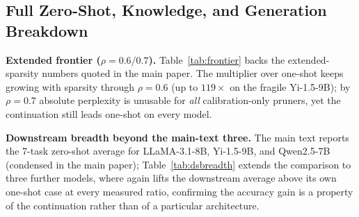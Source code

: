\subsection{Full Zero-Shot, Knowledge, and Generation Breakdown}
\label{app:breakdown}

\textbf{Extended frontier ($\rho{=}0.6/0.7$).} Table~\ref{tab:frontier} backs the extended-sparsity
numbers quoted in the main paper. The multiplier over one-shot keeps growing with sparsity through
$\rho{=}0.6$ (up to $119\times$ on the fragile Yi-1.5-9B); by $\rho{=}0.7$ absolute perplexity is unusable
for \emph{all} calibration-only pruners, yet the continuation still leads one-shot on every model.

\begin{table}[h]\centering\footnotesize
\setlength{\tabcolsep}{5pt}\renewcommand{\arraystretch}{1.06}
\caption{\textbf{Extended sparsity frontier} (WikiText-2 ppl $\downarrow$, $K{=}8$ equal-cost vs.\ one-shot,
no recovery). $k{=}10^3$. The gain over one-shot at $\rho{=}0.6$ is $24.5\times$/$24.1\times$/$119\times$
on LLaMA-2-7B/LLaMA-3.1-8B/Yi-1.5-9B; at $\rho{=}0.7$ no calibration-only method is deployable, but the
continuation still leads one-shot on every model. .}
\label{tab:frontier}
\end{table}


\textbf{Downstream breadth beyond the main-text three.} The main text reports the 7-task zero-shot average
for LLaMA-3.1-8B, Yi-1.5-9B, and Qwen2.5-7B (condensed in the main paper); Table~\ref{tab:dsbreadth}
extends the comparison to three further models, where \method again lifts the downstream average above its
own one-shot case at every measured ratio, confirming the accuracy gain is a property of the continuation
rather than of a particular architecture.

